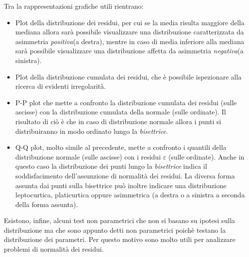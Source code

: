 \documentclass[a4page, 11pt]{article} %
\begin{document}
Tra la rappresentazioni grafiche utili rientrano:
\begin{itemize}[noitemsep]
\item Plot della distribuzione dei residui, per cui se la media risulta maggiore della mediana allora sarà possibile visualizzare una distribuzione caratterizzata da asimmetria \textit{positiva}(a destra), mentre in caso di media inferiore alla mediana sarà possibile visualizzare una distribuzione affetta da asimmetria \textit{negativa}(a sinistra).
\item Plot della distribuzione cumulata dei residui, che è possibile ispezionare alla ricerca di evidenti irregolarità.
\item P-P plot che mette a confronto la distribuzione cumulata dei residui (sulle ascisse) con la distribuzione cumulata della normale (sulle ordinate). Il risultato di ciò è che in caso di distribuzione normale allora i punti si distribuiranno in modo ordinato lungo la \textit{bisettrice}. 
\item Q-Q plot, molto simile al precedente, mette a confronto i quantili della distribuzione normale (sulle ascisse) con i residui $\varepsilon$ (sulle ordinate). Anche in questo caso la distribuzione dei punti lungo la \textit{bisettrice} indica il soddisfacimento dell'assunzione di normalità dei residui. La diversa forma assunta dai punti sulla bisettrice può inoltre indicare una distribuzione leptocurtica, platicurtica oppure asimmetrica (a destra o a sinistra a seconda della forma assunta).
\end{itemize}
Esistono, infine, alcuni test non parametrici che non si basano su ipotesi sulla distribuzione ma che sono appunto detti non parametrici poichè testano la distribuzione dei parametri. Per questo motivo sono molto utili per analizzare problemi di normalità dei residui.
\end{document}
